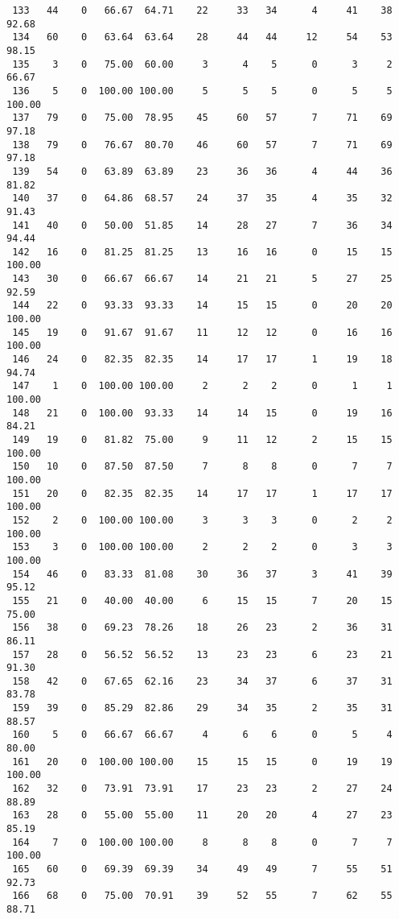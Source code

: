 \begin{verbatim}
 133   44    0   66.67  64.71    22     33   34      4     41    38    92.68
 134   60    0   63.64  63.64    28     44   44     12     54    53    98.15
 135    3    0   75.00  60.00     3      4    5      0      3     2    66.67
 136    5    0  100.00 100.00     5      5    5      0      5     5   100.00
 137   79    0   75.00  78.95    45     60   57      7     71    69    97.18
 138   79    0   76.67  80.70    46     60   57      7     71    69    97.18
 139   54    0   63.89  63.89    23     36   36      4     44    36    81.82
 140   37    0   64.86  68.57    24     37   35      4     35    32    91.43
 141   40    0   50.00  51.85    14     28   27      7     36    34    94.44
 142   16    0   81.25  81.25    13     16   16      0     15    15   100.00
 143   30    0   66.67  66.67    14     21   21      5     27    25    92.59
 144   22    0   93.33  93.33    14     15   15      0     20    20   100.00
 145   19    0   91.67  91.67    11     12   12      0     16    16   100.00
 146   24    0   82.35  82.35    14     17   17      1     19    18    94.74
 147    1    0  100.00 100.00     2      2    2      0      1     1   100.00
 148   21    0  100.00  93.33    14     14   15      0     19    16    84.21
 149   19    0   81.82  75.00     9     11   12      2     15    15   100.00
 150   10    0   87.50  87.50     7      8    8      0      7     7   100.00
 151   20    0   82.35  82.35    14     17   17      1     17    17   100.00
 152    2    0  100.00 100.00     3      3    3      0      2     2   100.00
 153    3    0  100.00 100.00     2      2    2      0      3     3   100.00
 154   46    0   83.33  81.08    30     36   37      3     41    39    95.12
 155   21    0   40.00  40.00     6     15   15      7     20    15    75.00
 156   38    0   69.23  78.26    18     26   23      2     36    31    86.11
 157   28    0   56.52  56.52    13     23   23      6     23    21    91.30
 158   42    0   67.65  62.16    23     34   37      6     37    31    83.78
 159   39    0   85.29  82.86    29     34   35      2     35    31    88.57
 160    5    0   66.67  66.67     4      6    6      0      5     4    80.00
 161   20    0  100.00 100.00    15     15   15      0     19    19   100.00
 162   32    0   73.91  73.91    17     23   23      2     27    24    88.89
 163   28    0   55.00  55.00    11     20   20      4     27    23    85.19
 164    7    0  100.00 100.00     8      8    8      0      7     7   100.00
 165   60    0   69.39  69.39    34     49   49      7     55    51    92.73
 166   68    0   75.00  70.91    39     52   55      7     62    55    88.71

\end{verbatim}
